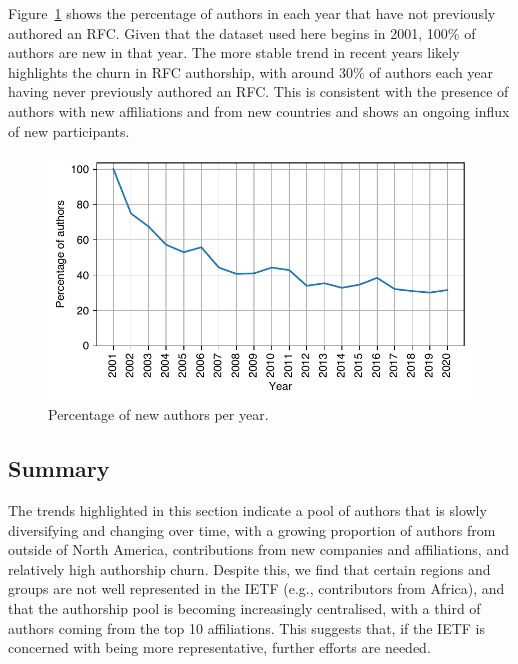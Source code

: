 \documentclass[twocolumn,10pt]{article}
\newlength{\figureWidthOneColumn}
\newcommand{\pb}[1]{\vspace{0.75ex}\noindent{\textbf{#1}}}
\begin{document}
\pb{Arrival of new authors:}
Figure~\ref{fig:author_new} shows the percentage of authors in each year
that have not previously authored an RFC. Given that the dataset used here
begins in 2001, 100\% of authors are new in that year. The more stable
trend in recent years likely highlights the churn in RFC authorship, with
around 30\% of authors each year having never previously authored an RFC.
This is consistent with the presence of authors with new affiliations
and from new countries and shows an ongoing influx of new participants.

\begin{figure}
  \centering
  \includegraphics[width=\figureWidthOneColumn]{figures-prev/imc-2021/authors/repeat_authors.pdf}
  \caption{
    Percentage of new authors per year.
  }
  \label{fig:author_new}
\end{figure}

\subsection{Summary}
The trends highlighted in this section  indicate a pool of authors that is
slowly diversifying and changing over time, with a growing proportion of authors
from outside of North America, contributions from new companies and
affiliations, and relatively high authorship churn. Despite this, we find
that certain regions and groups are not well represented in the IETF (e.g.,
contributors from Africa), and that the authorship pool is becoming
increasingly centralised, with a third of authors coming from the top 10
affiliations. This suggests that, if the IETF is concerned with being
more representative, further efforts are needed.
\end{document}
